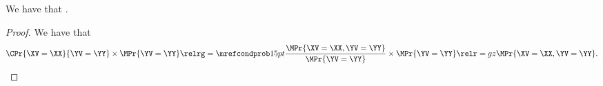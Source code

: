 \begin{proposition}
  We have that \cprobtomprobprop.%
\end{proposition}

\begin{proof}
  We have that 
  $$
  \CPr{\XV = \XX}{\YV = \YY} \times \MPr{\YV = \YY} 
  \relrg = {\mrefcondprob} 15pt \frac{\MPr{\XV = \XX, \YV = \YY}}{\MPr{\YV = \YY}} \times \MPr{\YV = \YY} 
  \relr = gz \MPr{\XV = \XX, \YV = \YY}.$$%
\end{proof}
